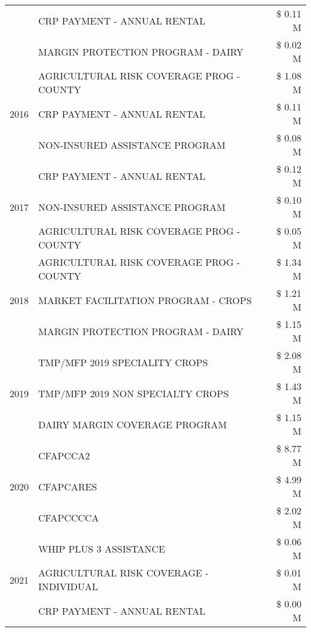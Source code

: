 \begin{tabular}{llr}
 & CRP PAYMENT - ANNUAL RENTAL & \$ 0.11 M \\
 & MARGIN PROTECTION PROGRAM - DAIRY & \$ 0.02 M \\
\cline{1-3}
\multirow[t]{3}{*}{2016} & AGRICULTURAL RISK COVERAGE PROG - COUNTY & \$ 1.08 M \\
 & CRP PAYMENT - ANNUAL RENTAL & \$ 0.11 M \\
 & NON-INSURED ASSISTANCE PROGRAM & \$ 0.08 M \\
\cline{1-3}
\multirow[t]{3}{*}{2017} & CRP PAYMENT - ANNUAL RENTAL & \$ 0.12 M \\
 & NON-INSURED ASSISTANCE PROGRAM & \$ 0.10 M \\
 & AGRICULTURAL RISK COVERAGE PROG - COUNTY & \$ 0.05 M \\
\cline{1-3}
\multirow[t]{3}{*}{2018} & AGRICULTURAL RISK COVERAGE PROG - COUNTY & \$ 1.34 M \\
 & MARKET FACILITATION PROGRAM - CROPS & \$ 1.21 M \\
 & MARGIN PROTECTION PROGRAM - DAIRY & \$ 1.15 M \\
\cline{1-3}
\multirow[t]{3}{*}{2019} & TMP/MFP 2019 SPECIALITY CROPS & \$ 2.08 M \\
 & TMP/MFP 2019 NON SPECIALTY CROPS & \$ 1.43 M \\
 & DAIRY MARGIN COVERAGE PROGRAM & \$ 1.15 M \\
\cline{1-3}
\multirow[t]{3}{*}{2020} & CFAPCCA2 & \$ 8.77 M \\
 & CFAPCARES & \$ 4.99 M \\
 & CFAPCCCCA & \$ 2.02 M \\
\cline{1-3}
\multirow[t]{3}{*}{2021} & WHIP PLUS 3 ASSISTANCE & \$ 0.06 M \\
 & AGRICULTURAL RISK COVERAGE - INDIVIDUAL & \$ 0.01 M \\
 & CRP PAYMENT - ANNUAL RENTAL & \$ 0.00 M \\
\cline{1-3}
\bottomrule
\end{tabular}

